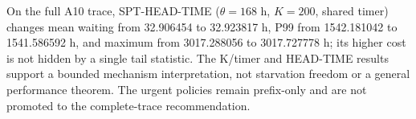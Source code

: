On the full A10 trace, SPT-HEAD-TIME ($\theta=168$ h, $K=200$, shared timer) changes mean waiting from 32.906454 to 32.923817 h, P99 from 1542.181042 to 1541.586592 h, and maximum from 3017.288056 to 3017.727778 h; its higher cost is not hidden by a single tail statistic. The K/timer and HEAD-TIME results support a bounded mechanism interpretation, not starvation freedom or a general performance theorem. The urgent policies remain prefix-only and are not promoted to the complete-trace recommendation.
